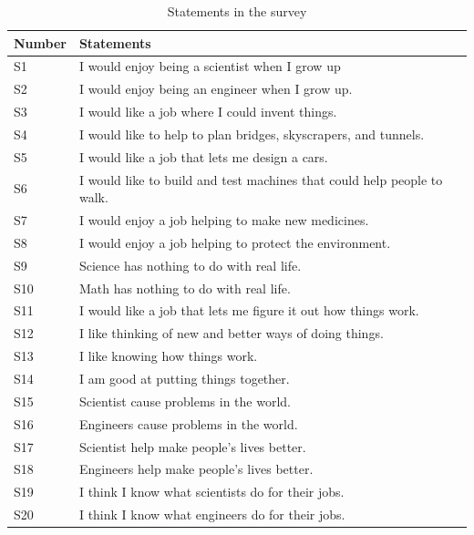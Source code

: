 \documentclass[sigconf,anonymous,review]{acmart}
\begin{document}
\begin{table}
  \caption{Statements in the survey}
  \label{tab:questions}
  \begin{tabular}{ll}
    \toprule
    Number & Statements \\
    \midrule
    S1 & I would enjoy being a scientist when I grow up \\
    S2 & I would enjoy being an engineer when I grow up.  \\
    S3 & I would like a job where I could invent things. \\
    S4 & I would like to help to plan bridges, skyscrapers, and tunnels. \\
    S5 & I would like a job that lets me design a cars. \\   
    S6 & I would like to build and test machines that could help people to walk. \\
    S7 & I would enjoy a job helping to make new medicines. \\
    S8 & I would enjoy a job helping to protect the environment. \\
    S9 & Science has nothing to do with real life. \\
    S10 & Math has nothing to do with real life. \\
    S11 & I would like a job that lets me figure it out how things work. \\
    S12 & I like thinking of new and better ways of doing things. \\
    S13 & I like knowing how things work. \\
    S14 & I am good at putting things together. \\
    S15 & Scientist cause problems in the world. \\
    S16 & Engineers cause problems in the world. \\
    S17 & Scientist help make people’s lives better. \\
    S18 & Engineers help make people’s lives better. \\
    S19 & I think I know what scientists do for their jobs. \\
    S20 & I think I know what engineers do for their jobs. \\
    \bottomrule
  \end{tabular}
\end{table}
\end{document}
